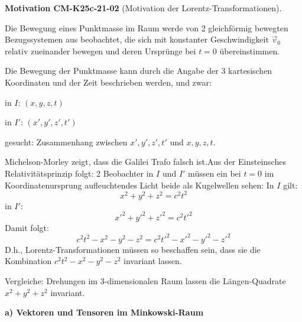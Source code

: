 \documentclass[10pt, letterpaper]{article}
\newcommand{\CustomHeading}[3]{%
  \par\medskip\noindent%
  \textbf{#1 #2} \textnormal{(#3)}.\enskip%
}
\newenvironment{MOT}[2]{\begin{unitbox}\CustomHeading{Motivation}{#1}{#2}}{\end{unitbox}}
\begin{document}
\begin{MOT}{CM-K25c-21-02}{Motivation der Lorentz-Transformationen}
Die Bewegung eines Punktmasse im Raum werde von 2 gleichförmig bewegten Bezugssystemen aus beobachtet, die sich mit konstanter Geschwindigkeit $\vec{v}_0$ relativ zueinander bewegen und deren Ursprünge bei $t=0$ übereinstimmen.

\begin{center}
\end{center}

Die Bewegung der Punktmasse kann durch die Angabe der 3 kartesischen Koordinaten und der Zeit beschrieben werden, und zwar:

in $I$: $(x,y,z,t)$

in $I'$: $(x',y',z',t')$

gesucht: Zusammenhang zwischen $x',y',z',t'$ und $x,y,z,t$.

Michelson-Morley zeigt, dass die Galilei Trafo falsch ist.Aus der Einsteinsches Relativitätsprinzip folgt: 2 Beobachter in $I$ und $I'$ müssen ein bei $t=0$ im Koordinatenursprung aufleuchtendes Licht beide als Kugelwellen sehen: In $I$ gilt: 
$$x^2+y^2+z^2 = c^2t^2$$
in $I'$: 
$$x'^2+y'^2+z'^2 = c^2t'^2$$
Damit folgt:
$$c^2t^2 - x^2-y^2-z^2 = c^2t'^2 - x'^2-y'^2-z'^2$$
D.h., Lorentz-Transformationen müssen so beschaffen sein, dass sie die Kombination $c^2t^2-x^2-y^2-z^2$ invariant lassen.
\end{MOT}

Vergleiche: Drehungen im 3-dimensionalen Raum lassen die Längen-Quadrate $x^2+y^2+z^2$ invariant.

\textbf{a) Vektoren und Tensoren im Minkowski-Raum}
\end{document}
